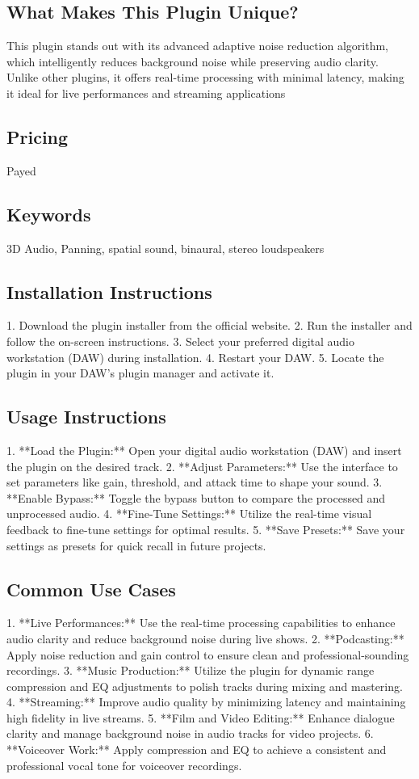 \documentclass[8pt]{article}
\begin{document}
    \subsection*{What Makes This Plugin Unique?}
    This plugin stands out with its advanced adaptive noise reduction algorithm, which intelligently reduces background noise while preserving audio clarity. Unlike other plugins, it offers real-time processing with minimal latency, making it ideal for live performances and streaming applications

    \subsection*{Pricing}
    Payed

    \subsection*{Keywords}
    3D Audio, Panning, spatial sound, binaural, stereo loudspeakers

    \subsection*{Installation Instructions}
    1. Download the plugin installer from the official website.
2. Run the installer and follow the on-screen instructions.
3. Select your preferred digital audio workstation (DAW) during installation.
4. Restart your DAW.
5. Locate the plugin in your DAW’s plugin manager and activate it.

    \subsection*{Usage Instructions}
    1. **Load the Plugin:** Open your digital audio workstation (DAW) and insert the plugin on the desired track.
2. **Adjust Parameters:** Use the interface to set parameters like gain, threshold, and attack time to shape your sound.
3. **Enable Bypass:** Toggle the bypass button to compare the processed and unprocessed audio.
4. **Fine-Tune Settings:** Utilize the real-time visual feedback to fine-tune settings for optimal results.
5. **Save Presets:** Save your settings as presets for quick recall in future projects.

    \subsection*{Common Use Cases}
    1. **Live Performances:** Use the real-time processing capabilities to enhance audio clarity and reduce background noise during live shows.
2. **Podcasting:** Apply noise reduction and gain control to ensure clean and professional-sounding recordings.
3. **Music Production:** Utilize the plugin for dynamic range compression and EQ adjustments to polish tracks during mixing and mastering.
4. **Streaming:** Improve audio quality by minimizing latency and maintaining high fidelity in live streams.
5. **Film and Video Editing:** Enhance dialogue clarity and manage background noise in audio tracks for video projects.
6. **Voiceover Work:** Apply compression and EQ to achieve a consistent and professional vocal tone for voiceover recordings.
\end{document}
